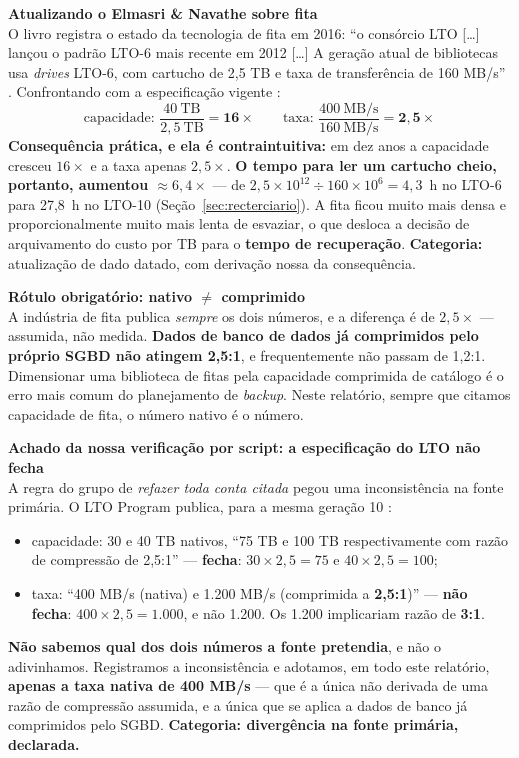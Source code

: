 \documentclass[11pt,a4paper]{article}
\newcommand{\correcao}[2]{%
  \begin{center}\begin{minipage}{0.96\textwidth}
  \colorbox{fundo}{\begin{minipage}{\dimexpr\linewidth-2\fboxsep}
  \vspace{2pt}\textbf{\color{laranja}\small #1}\\[1pt]\footnotesize #2\vspace{3pt}
  \end{minipage}}\end{minipage}\end{center}}
\begin{document}
\correcao{Atualizando o Elmasri \& Navathe sobre fita}{%
O livro registra o estado da tecnologia de fita em 2016: ``o consórcio LTO [\ldots] lançou o padrão
LTO-6 mais recente em 2012 [\ldots] A geração atual de bibliotecas usa \textit{drives} LTO-6, com
cartucho de 2,5 TB e taxa de transferência de 160 MB/s'' \cite{elmasri2018}. Confrontando com a
especificação vigente \cite{lto10}:
\[
\text{capacidade: } \frac{40\ \text{TB}}{2{,}5\ \text{TB}} = \mathbf{16\times}
\qquad
\text{taxa: } \frac{400\ \text{MB/s}}{160\ \text{MB/s}} = \mathbf{2{,}5\times}
\]
\textbf{Consequência prática, e ela é contraintuitiva:} em dez anos a capacidade cresceu $16\times$
e a taxa apenas $2{,}5\times$. \textbf{O tempo para ler um cartucho cheio, portanto, aumentou
${\approx}6{,}4\times$} --- de $2{,}5\times10^{12} \div 160\times10^{6} = 4{,}3$~h no LTO-6 para
27,8~h no LTO-10 (Seção~\ref{sec:recterciario}). A fita ficou muito mais densa e proporcionalmente
muito mais lenta de esvaziar, o que desloca a decisão de arquivamento do custo por TB para o
\textbf{tempo de recuperação}. \textbf{Categoria:} atualização de dado datado, com derivação nossa
da consequência.}

\correcao{Rótulo obrigatório: nativo $\neq$ comprimido}{%
A indústria de fita publica \emph{sempre} os dois números, e a diferença é de $2{,}5\times$ ---
assumida, não medida. \textbf{Dados de banco de dados já comprimidos pelo próprio SGBD não atingem
2,5:1}, e frequentemente não passam de 1,2:1. Dimensionar uma biblioteca de fitas pela capacidade
comprimida de catálogo é o erro mais comum do planejamento de \textit{backup}. Neste relatório,
sempre que citamos capacidade de fita, o número nativo é o número.}

\correcao{Achado da nossa verificação por script: a especificação do LTO não fecha}{%
A regra do grupo de \emph{refazer toda conta citada} pegou uma inconsistência na fonte primária.
O LTO Program publica, para a mesma geração 10 \cite{lto10}:
\begin{itemize}[leftmargin=0.7cm,itemsep=1pt,topsep=2pt]
\item capacidade: 30 e 40 TB nativos, ``75 TB e 100 TB respectivamente com razão de compressão de
      2,5:1'' --- \textbf{fecha}: $30 \times 2{,}5 = 75$ e $40 \times 2{,}5 = 100$;
\item taxa: ``400 MB/s (nativa) e 1.200 MB/s (comprimida a \textbf{2,5:1})'' --- \textbf{não fecha}:
      $400 \times 2{,}5 = \mathbf{1.000}$, e não 1.200. Os 1.200 implicariam razão de \textbf{3:1}.
\end{itemize}
\textbf{Não sabemos qual dos dois números a fonte pretendia}, e não o adivinhamos. Registramos a
inconsistência e adotamos, em todo este relatório, \textbf{apenas a taxa nativa de 400 MB/s} --- que
é a única não derivada de uma razão de compressão assumida, e a única que se aplica a dados de banco
já comprimidos pelo SGBD. \textbf{Categoria: divergência na fonte primária, declarada.}}
\end{document}
